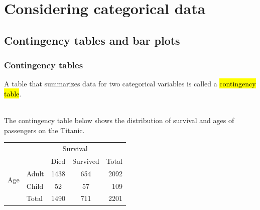 \documentclass[slidestop,compress,mathserif]{beamer}
\begin{document}


\section{Considering categorical data}


\subsection{Contingency tables and bar plots}


\begin{frame}
\frametitle{Contingency tables}

A table that summarizes data for two categorical variables is called a \hl{contingency table}.

$\:$ \\
\pause
The contingency table below shows the distribution of survival and ages of passengers on the Titanic.

\begin{center}
\begin{tabular}{l l cc r}
					               & 			 & \multicolumn{2}{c}{{Survival}} \\
  \cline{3-4}
					               &			 & Died	 & Survived	& Total \\ 
  \cline{2-5}
\multirow{2}{*}{{Age}}& Adult & 1438  & 654 	  	& 2092 \\ 
  					             & Child & 52 	 & 57	 	    & 109\\ 
  \cline{2-5}
  					             & Total & 1490  & 711	    &  2201 \\
  \cline{2-5}
\end{tabular}
\end{center}
\end{frame}

\end{document}
